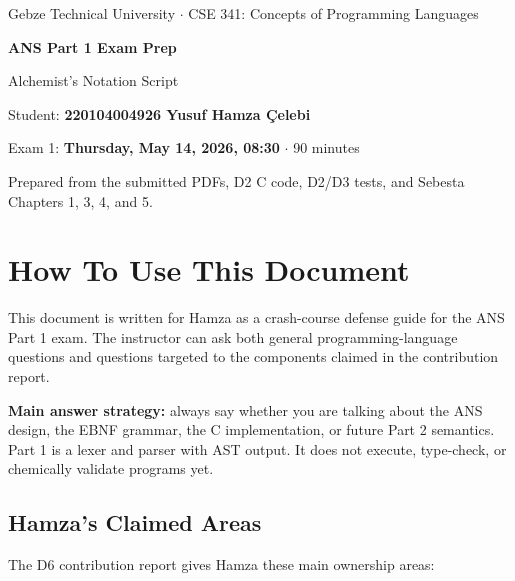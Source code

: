 \documentclass[11pt,a4paper]{article}
\newcommand{\studentName}{Yusuf Hamza \c{C}elebi}
\begin{document}
\begin{center}
  {\footnotesize\color{ansgray}Gebze Technical University \(\cdot\) CSE 341: Concepts of Programming Languages\par}
  \vspace{8pt}
  {\Huge\bfseries\sffamily ANS Part 1 Exam Prep\par}
  \vspace{4pt}
  {\Large Alchemist's Notation Script\par}
  \vspace{8pt}
  {\normalsize Student: \textbf{220104004926 \studentName}\par}
  {\normalsize Exam 1: \textbf{Thursday, May 14, 2026, 08:30} \(\cdot\) 90 minutes\par}
  \vspace{8pt}
  {\small Prepared from the submitted PDFs, D2 C code, D2/D3 tests, and Sebesta Chapters 1, 3, 4, and 5.}
\end{center}

\vspace{8pt}
\tableofcontents
\newpage

\section{How To Use This Document}

This document is written for Hamza as a crash-course defense guide for the ANS Part 1 exam. The instructor can ask both general programming-language questions and questions targeted to the components claimed in the contribution report.

\textbf{Main answer strategy:} always say whether you are talking about the ANS design, the EBNF grammar, the C implementation, or future Part 2 semantics. Part 1 is a lexer and parser with AST output. It does not execute, type-check, or chemically validate programs yet.

\subsection{Hamza's Claimed Areas}

The D6 contribution report gives Hamza these main ownership areas:
\end{document}

